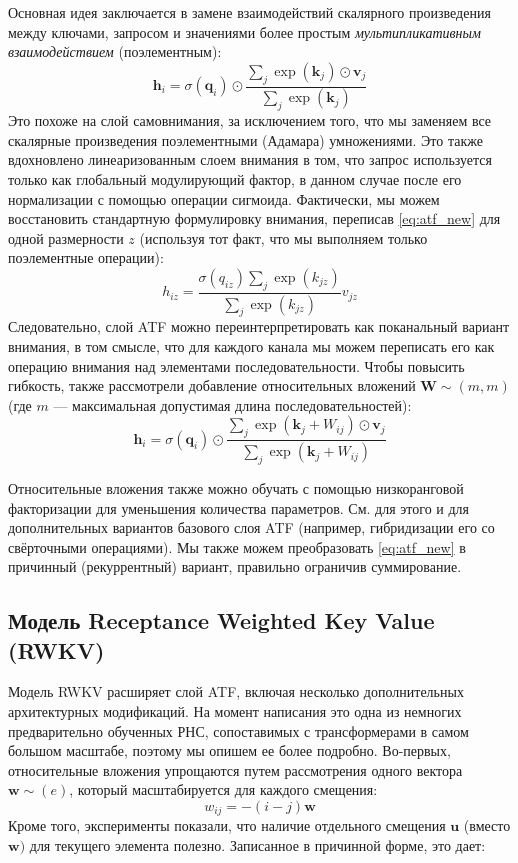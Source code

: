Основная идея заключается в замене взаимодействий скалярного произведения между ключами, запросом и значениями более простым \textit{мультипликативным взаимодействием} (поэлементным):
%
\begin{equation}
\mathbf{h}_i=\sigma(\mathbf{q}_i) \odot\frac{\sum_j \exp\left(\mathbf{k}_j \right) \odot \mathbf{v}_j}{\sum_j\exp\left(\mathbf{k}_j \right)}
\label{eq:atf_new}
\end{equation}
%
Это похоже на слой самовнимания, за исключением того, что мы заменяем все скалярные произведения поэлементными (Адамара) умножениями. Это также вдохновлено линеаризованным слоем внимания в том, что запрос используется только как глобальный модулирующий фактор, в данном случае после его нормализации с помощью операции сигмоида. Фактически, мы можем восстановить стандартную формулировку внимания, переписав \eqref{eq:atf_new} для одной размерности $z$ (используя тот факт, что мы выполняем только поэлементные операции):
%
$$
h_{iz}=\frac{\sigma(q_{iz})\sum_{j}\exp(k_{jz})}{\sum_j \exp(k_{jz})}v_{jz}
$$
%
Следовательно, слой ATF можно переинтерпретировать как поканальный вариант внимания, в том смысле, что для каждого канала мы можем переписать его как операцию внимания над элементами последовательности. Чтобы повысить гибкость, \cite{zhai2021attention} также рассмотрели добавление относительных вложений $\mathbf{W} \sim (m, m)$ (где $m$ — максимальная допустимая длина последовательностей):
%
\begin{equation}\mathbf{h}_i=\sigma(\mathbf{q}_i) \odot\frac{\sum_j \exp\left(\mathbf{k}_j +W_{ij}\right) \odot \mathbf{v}_j}{\sum_j\exp\left(\mathbf{k}_j +W_{ij}\right)}\end{equation}

Относительные вложения также можно обучать с помощью низкоранговой факторизации для уменьшения количества параметров. См. \cite{zhai2021attention} для этого и для дополнительных вариантов базового слоя ATF (например, гибридизации его со свёрточными операциями). Мы также можем преобразовать \eqref{eq:atf_new} в причинный (рекуррентный) вариант, правильно ограничив суммирование.

\subsection{Модель Receptance Weighted Key Value (RWKV)}

Модель RWKV \cite{peng2023rwkv} расширяет слой ATF, включая несколько дополнительных архитектурных модификаций. На момент написания это одна из немногих предварительно обученных РНС, сопоставимых с трансформерами в самом большом масштабе, поэтому мы опишем ее более подробно. Во-первых, относительные вложения упрощаются путем рассмотрения одного вектора $\mathbf{w} \sim (e)$, который масштабируется для каждого смещения:
%
$$
w_{ij}=-(i-j)\mathbf{w}
$$
%
Кроме того, эксперименты показали, что наличие отдельного смещения $\mathbf{u}$ (вместо $\mathbf{w})$ для текущего элемента полезно. Записанное в причинной форме, это дает:


